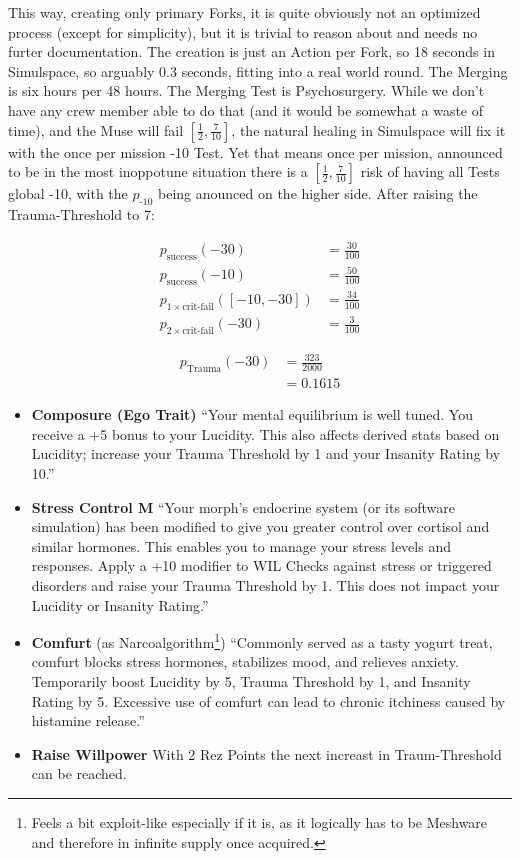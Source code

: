 This way, creating only primary \glspl{Fork}, it is quite obviously not an optimized process (except for simplicity), but it is trivial to reason about and needs no furter documentation. The creation is just an Action per \gls{Fork}, so 18 seconds in Simulspace, so arguably 0.3 seconds, fitting into a real world round. The Merging is six hours per 48 hours. The Merging Test is Psychosurgery. While we don't have any crew member able to do that (and it would be somewhat a waste of time), and the Muse will fail $\left[\frac{1}{2}, \frac{7}{10}\right]$, the natural healing in Simulspace will fix it with the once per mission -10 Test. Yet that means once per mission, announced to be in the most inoppotune situation there is a $\left[\frac{1}{2}, \frac{7}{10}\right]$ risk of having all Tests global -10, with the $p_{\text{-10}}$ being anounced on the higher side. After raising the Trauma-Threshold to 7:

\begin{align}
    p_{\text{success}}(-30) &= \frac{30}{100} \\
    p_{\text{success}}(-10) &= \frac{50}{100} \\
    p_{1 \times \text{crit-fail}}(\left[-10,-30\right]) &= \frac{34}{100} \\
    p_{2 \times \text{crit-fail}}(-30) &= \frac{3}{100}
\end{align}

\begin{align}
    p_{\text{Trauma}}(-30) &= \frac{323}{2000} \\
    &= 0.1615
\end{align}

\begin{itemize}
    \item \textbf{Composure (Ego Trait)} “Your mental equilibrium is well tuned. You receive a +5 bonus to your Lucidity. This also affects derived stats based on Lucidity; increase your Trauma Threshold by 1 and your Insanity Rating by 10.” \citep[pg. 73]{ep2e_1.1_2019}
    \item \textbf{Stress Control M} “Your morph’s endocrine system (or its software simulation) has been modified to give you greater control over cortisol and similar hormones. This enables you to manage your stress levels and responses. Apply a +10 modifier to WIL Checks against stress or triggered disorders and raise your Trauma Threshold by 1. This does not impact your Lucidity or Insanity Rating.” \citep[pg. 323]{ep2e_1.1_2019}
    \item \textbf{Comfurt} (as Narcoalgorithm\footnote{Feels a bit exploit-like especially if it is, as it logically has to be Meshware and therefore in infinite supply once acquired.}) “Commonly served as a tasty yogurt treat, comfurt blocks stress hormones, stabilizes mood, and relieves anxiety. Temporarily boost Lucidity by 5, Trauma Threshold by 1, and Insanity Rating by 5. Excessive use of comfurt can lead to chronic itchiness caused by histamine release.” \citep[pg. 332]{ep2e_1.1_2019}
    \item \textbf{Raise Willpower} With 2 Rez Points the next increast in Traum-Threshold can be reached.
\end{itemize}

